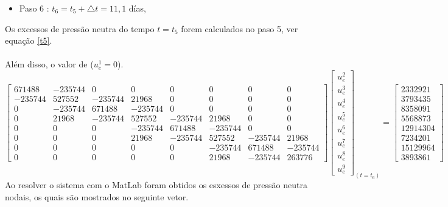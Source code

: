 \documentclass{article} %
\begin{document}
\begin{itemize}
	\item Paso 6 : \(t_6=t_5+\triangle t=11,1\) días,
\end{itemize}

Os excessos de pressão neutra do tempo \(t=t_5\) forem calculados no paso 5, ver equação \ref{t5}.\\
\\
\indent Além disso, o valor de (\(u_e^1=0\)).\\

\begin{equation*}
\begin{bmatrix}
671488& -235744& 0& 0& 0& 0& 0& 0\\
-235744&527552&-235744&21968& 0& 0& 0& 0\\
0&-235744&671488&-235744& 0& 0& 0& 0\\
0&21968&-235744&527552&-235744&21968& 0& 0\\
0&0&0& -235744&671488&-235744& 0& 0\\
0&0&0&21968&-235744&527552&-235744&21968\\
0&0&0&0&0&-235744&671488&-235744\\
0&0&0&0&0&21968&-235744&263776
\end{bmatrix}\begin{bmatrix}
u_e^2\\
u_e^3\\
u_e^4\\
u_e^5\\
u_e^6\\
u_e^7\\
u_e^8\\
u_e^9
\end{bmatrix}_{(t=t_6)}
=\begin{bmatrix}
2332921\\
3793435\\
8358091\\
5568873\\
12914304\\
7234201\\
15129964\\
3893861
\end{bmatrix}
\end{equation*}
\indent Ao resolver o sistema com o MatLab foram obtidos os esxessos de pressão neutra nodais, os quais são mostrados no seguinte vetor.
\end{document}
